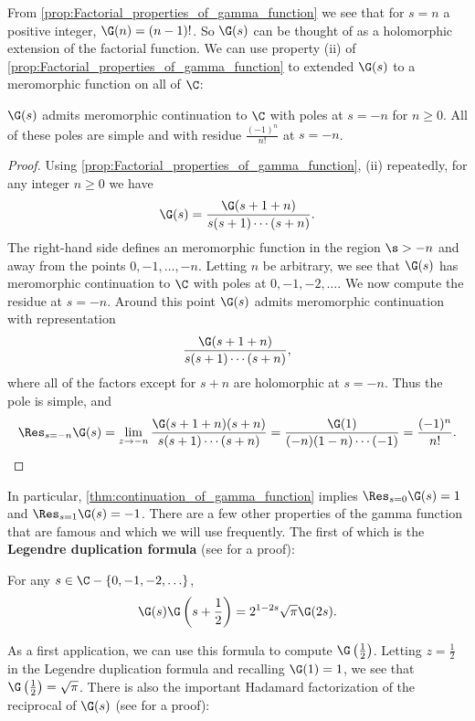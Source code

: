     From \cref{prop:Factorial_properties_of_gamma_function} we see that for $s = n$ a positive integer, $\G(n) = (n-1)!$. So $\G(s)$ can be thought of as a holomorphic extension of the factorial function. We can use property (ii) of \cref{prop:Factorial_properties_of_gamma_function} to extended $\G(s)$ to a meromorphic function on all of $\C$:

    \begin{theorem}\label{thm:continuation_of_gamma_function}
      $\G(s)$ admits meromorphic continuation to $\C$ with poles at $s = -n$ for $n \ge 0$. All of these poles are simple and with residue $\frac{(-1)^{n}}{n!}$ at $s = -n$.
    \end{theorem}
    \begin{proof}
      Using \cref{prop:Factorial_properties_of_gamma_function}, (ii) repeatedly, for any integer $n \ge 0$ we have
      \[
        \G(s) = \frac{\G(s+1+n)}{s(s+1) \cdots (s+n)}.
      \]
      The right-hand side defines an meromorphic function in the region $\s > -n$ and away from the points $0,-1,\ldots,-n$. Letting $n$ be arbitrary, we see that $\G(s)$ has meromorphic continuation to $\C$ with poles at $0,-1,-2,\ldots$. We now compute the residue at $s = -n$. Around this point $\G(s)$ admits meromorphic continuation with representation
      \[
        \frac{\G(s+1+n)}{s(s+1) \cdots (s+n)},
      \]
      where all of the factors except for $s+n$ are holomorphic at $s = -n$. Thus the pole is simple, and
      \[
        \Res_{s = -n}\G(s) = \lim_{z \to -n}\frac{\G(s+1+n)(s+n)}{s(s+1) \cdots (s+n)} = \frac{\G(1)}{(-n)(1-n) \cdots (-1)} = \frac{(-1)^{n}}{n!}.
      \]
    \end{proof}

    In particular, \cref{thm:continuation_of_gamma_function} implies $\Res_{s = 0}\G(s) = 1$ and $\Res_{s = 1}\G(s) = -1$. There are a few other properties of the gamma function that are famous and which we will use frequently. The first of which is the \textbf{Legendre duplication formula} (see \cite{remmert1998classical} for a proof):

    \begin{theorem}
      For any $s \in \C-\{0,-1,-2,\ldots\}$,
      \[
        \G(s)\G\left(s+\frac{1}{2}\right) = 2^{1-2s}\sqrt{\pi}\G(2s).
      \]
    \end{theorem}

    As a first application, we can use this formula to compute $\G\left(\frac{1}{2}\right)$. Letting $z = \frac{1}{2}$ in the Legendre duplication formula and recalling $\G(1) = 1$, we see that $\G\left(\frac{1}{2}\right) = \sqrt{\pi}$. There is also the important Hadamard factorization of the reciprocal of $\G(s)$ (see \cite{stein2003complex} for a proof):

